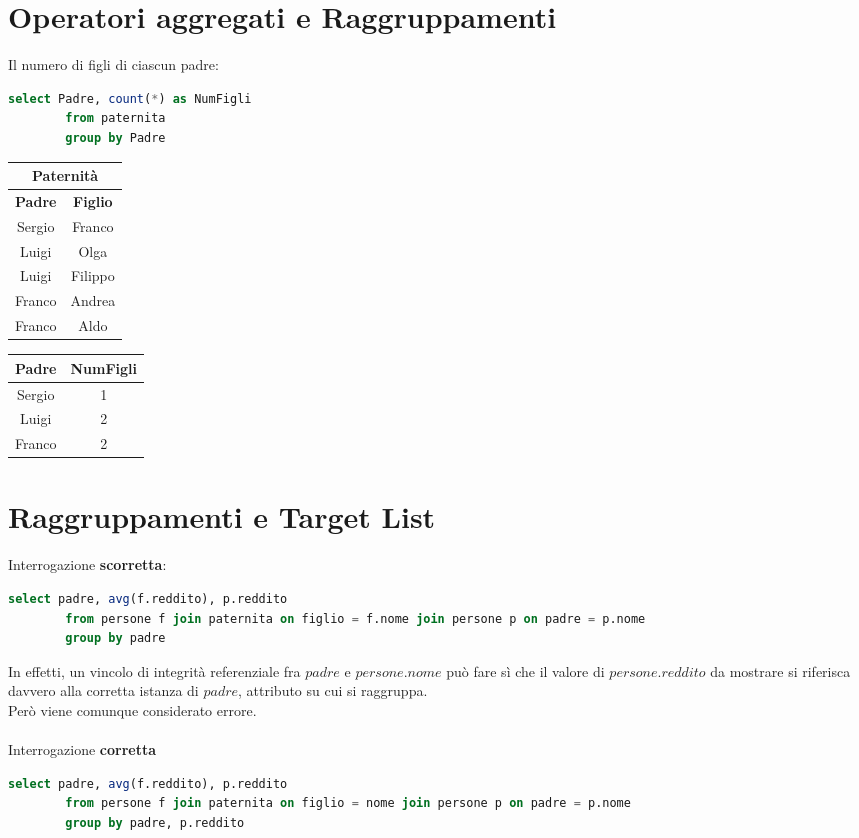 \documentclass{article}
\begin{document}
	\section{Operatori aggregati e Raggruppamenti}
	Il numero di figli di ciascun padre:
	\begin{lstlisting}[language=SQL]
		select Padre, count(*) as NumFigli
		from paternita
		group by Padre
	\end{lstlisting}
	\begin{center}
		\begin{tabular}{ |c|c| }
			\hline
			\multicolumn{2}{|c|}{Paternità}\\
			\hline
			\textbf{Padre} & \textbf{Figlio}\\
			\hline
			Sergio & Franco\\
			\hline
			Luigi & Olga\\
			Luigi & Filippo\\
			\hline
			Franco & Andrea\\
			Franco & Aldo\\
			\hline
		\end{tabular}
		\begin{tabular}{ |c|c| }
			\hline
			\textbf{Padre} & \textbf{NumFigli}\\
			\hline
			Sergio & 1\\
			Luigi & 2\\
			Franco & 2\\
			\hline
		\end{tabular}
	\end{center}
	\section{Raggruppamenti e Target List}
	Interrogazione \textbf{scorretta}:
	\begin{lstlisting}[language=SQL]
		select padre, avg(f.reddito), p.reddito
		from persone f join paternita on figlio = f.nome join persone p on padre = p.nome
		group by padre
	\end{lstlisting}
	In effetti, un vincolo di integrità referenziale fra $padre$ e $persone.nome$ può fare sì che il valore di $persone.reddito$ da mostrare si riferisca davvero alla corretta istanza di $padre$, attributo su cui si raggruppa. \\
	Però viene comunque considerato errore.\\\\
	Interrogazione \textbf{corretta}
	\begin{lstlisting}[language=SQL]
		select padre, avg(f.reddito), p.reddito
		from persone f join paternita on figlio = nome join persone p on padre = p.nome
		group by padre, p.reddito
	\end{lstlisting}
\end{document}

